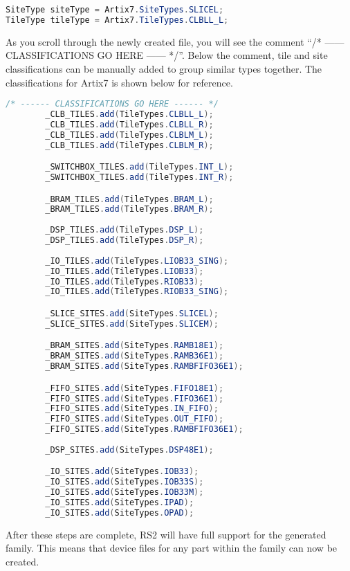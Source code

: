\begin {enumerate}
\begin{lstlisting}[language=java,numbers=none]
SiteType siteType = Artix7.SiteTypes.SLICEL;
TileType tileType = Artix7.TileTypes.CLBLL_L;
\end{lstlisting}

	\noindent As you scroll through the newly created file, you will see the
	comment ``/* ------ CLASSIFICATIONS GO HERE ------ */''. Below the comment,
	tile and site classifications can be manually added to group similar types
	together. The classifications for Artix7 is shown below for reference.  

\begin{lstlisting}[language=java,numbers=none]
 /* ------ CLASSIFICATIONS GO HERE ------ */
        _CLB_TILES.add(TileTypes.CLBLL_L);
        _CLB_TILES.add(TileTypes.CLBLL_R);
        _CLB_TILES.add(TileTypes.CLBLM_L);
        _CLB_TILES.add(TileTypes.CLBLM_R);

        _SWITCHBOX_TILES.add(TileTypes.INT_L);
        _SWITCHBOX_TILES.add(TileTypes.INT_R);

        _BRAM_TILES.add(TileTypes.BRAM_L);
        _BRAM_TILES.add(TileTypes.BRAM_R);
	
        _DSP_TILES.add(TileTypes.DSP_L);
        _DSP_TILES.add(TileTypes.DSP_R);
	
        _IO_TILES.add(TileTypes.LIOB33_SING);
        _IO_TILES.add(TileTypes.LIOB33);
        _IO_TILES.add(TileTypes.RIOB33);
        _IO_TILES.add(TileTypes.RIOB33_SING);

        _SLICE_SITES.add(SiteTypes.SLICEL);
        _SLICE_SITES.add(SiteTypes.SLICEM);

        _BRAM_SITES.add(SiteTypes.RAMB18E1);
        _BRAM_SITES.add(SiteTypes.RAMB36E1);
        _BRAM_SITES.add(SiteTypes.RAMBFIFO36E1);

        _FIFO_SITES.add(SiteTypes.FIFO18E1);
        _FIFO_SITES.add(SiteTypes.FIFO36E1);
        _FIFO_SITES.add(SiteTypes.IN_FIFO);
        _FIFO_SITES.add(SiteTypes.OUT_FIFO);
        _FIFO_SITES.add(SiteTypes.RAMBFIFO36E1);
        
        _DSP_SITES.add(SiteTypes.DSP48E1);

        _IO_SITES.add(SiteTypes.IOB33);
        _IO_SITES.add(SiteTypes.IOB33S);
        _IO_SITES.add(SiteTypes.IOB33M);
        _IO_SITES.add(SiteTypes.IPAD);
        _IO_SITES.add(SiteTypes.OPAD);
\end{lstlisting}

\end{enumerate}


\noindent After these steps are complete, RS2 will have full support for
the generated family. This means that device files for any part within the
family can now be created.
 
